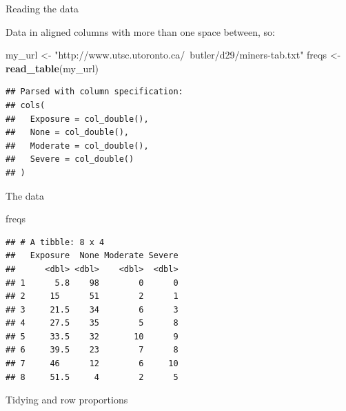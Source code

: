 \documentclass[
  ignorenonframetext,
]{beamer}
\newenvironment{Shaded}{\begin{snugshade}}{\end{snugshade}}
\newcommand{\DataTypeTok}[1]{\textcolor[rgb]{0.13,0.29,0.53}{#1}}
\newcommand{\KeywordTok}[1]{\textcolor[rgb]{0.13,0.29,0.53}{\textbf{#1}}}
\newcommand{\NormalTok}[1]{#1}
\newcommand{\OperatorTok}[1]{\textcolor[rgb]{0.81,0.36,0.00}{\textbf{#1}}}
\newcommand{\StringTok}[1]{\textcolor[rgb]{0.31,0.60,0.02}{#1}}
\begin{document}
\begin{frame}[fragile]{Reading the data}
\protect\hypertarget{reading-the-data}{}

Data in aligned columns with more than one space between, so:

\small

\begin{Shaded}
\begin{Highlighting}[]
\NormalTok{my_url <-}\StringTok{ "http://www.utsc.utoronto.ca/~butler/d29/miners-tab.txt"}
\NormalTok{freqs <-}\StringTok{ }\KeywordTok{read_table}\NormalTok{(my_url)}
\end{Highlighting}
\end{Shaded}

\begin{verbatim}
## Parsed with column specification:
## cols(
##   Exposure = col_double(),
##   None = col_double(),
##   Moderate = col_double(),
##   Severe = col_double()
## )
\end{verbatim}

\normalsize

\end{frame}

\begin{frame}[fragile]{The data}
\protect\hypertarget{the-data-3}{}

\begin{Shaded}
\begin{Highlighting}[]
\NormalTok{freqs}
\end{Highlighting}
\end{Shaded}

\begin{verbatim}
## # A tibble: 8 x 4
##   Exposure  None Moderate Severe
##      <dbl> <dbl>    <dbl>  <dbl>
## 1      5.8    98        0      0
## 2     15      51        2      1
## 3     21.5    34        6      3
## 4     27.5    35        5      8
## 5     33.5    32       10      9
## 6     39.5    23        7      8
## 7     46      12        6     10
## 8     51.5     4        2      5
\end{verbatim}

\end{frame}

\begin{frame}[fragile]{Tidying and row proportions}
\protect\hypertarget{tidying-and-row-proportions}{}

\begin{Shaded}
\end{Shaded}

\end{frame}
\end{document}
